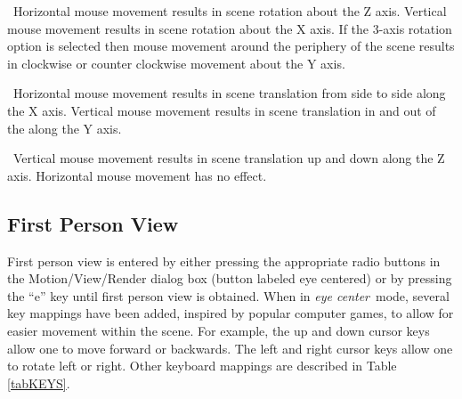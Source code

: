 \documentclass[11pt,twoside]{book}
\newcommand{\parma}{.75}
\newcommand{\parmb}{.5}
\newcommand{\parmc}{0.25}
\newcommand{\blist}{
\begin{list}
{}{
\setlength{\leftmargin}{\parma in}
\setlength{\labelwidth}{\parmb in}
\setlength{\labelsep}{\parmc in}
\setlength{\listparindent}{0.3in}
\setlength{\topsep}{.3in}
\setlength{\parsep}{.0in}
}}
\newcommand{\elist}{\end{list}}
\newcommand{\hitem}[1]{\item[{\bf #1} \hfill]}
\begin{document}
\blist

\hitem{no modifier keys}\ Horizontal mouse movement results in
scene rotation about the Z axis. Vertical mouse movement results
in scene rotation about the X axis.  If the 3-axis rotation option
is selected then mouse movement around the periphery of the scene
results in clockwise or counter clockwise movement about the Y
axis.

\hitem{CTRL key depressed}\ Horizontal mouse movement results in
scene translation from side to side along the X axis. Vertical
mouse movement results in scene translation in and out of the
along the Y axis.

\hitem{ALT key depressed}\ Vertical mouse movement results in scene
translation up and down along the Z axis. Horizontal mouse
movement has no effect.

\elist

\subsection{First Person View}
\label{section:eyeview}
First person view is entered by either pressing the appropriate
radio buttons in the Motion/View/Render dialog box (button
labeled eye centered) or by pressing the ``e'' key until first
person view is obtained. When in {\em eye center}\ mode, several
key mappings have been added, inspired by popular computer games,
to allow for easier movement within the scene. For example, the up
and down cursor keys allow one to move forward or backwards.  The
left and right cursor keys allow one to rotate left or right.
Other keyboard mappings are described in Table \ref{tabKEYS}.
\end{document}

